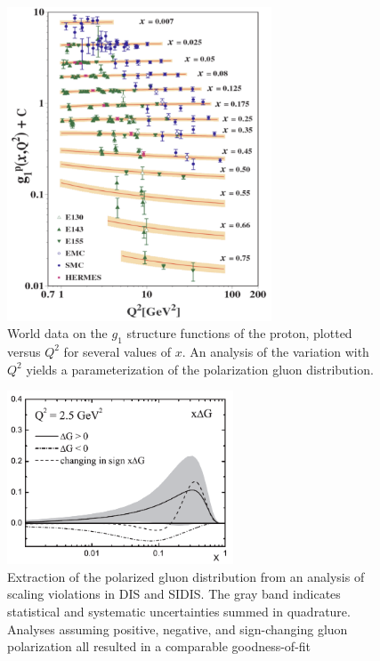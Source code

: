 \begin{figure}
  \centering
  \includegraphics[width=0.7\textwidth]{figures/g1_x_q2}
  \caption{World data on the $g_1$ structure functions of the proton, plotted
  versus $Q^2$ for several values of $x$. An analysis of the variation with
  $Q^2$ yields a parameterization of the polarization gluon distribution.}
  \label{fig:g1-versus-q2}
\end{figure}

\begin{figure}
  \centering
  \includegraphics[width=0.6\textwidth]{figures/lss06_deltag}
  \caption{Extraction of the polarized gluon distribution from an analysis of
  scaling violations in DIS and SIDIS. The gray band indicates statistical and
  systematic uncertainties summed in quadrature. Analyses assuming positive,
  negative, and sign-changing gluon polarization all resulted in a comparable
  goodness-of-fit \cite{Leader:2006xc}}
  \label{fig:g1-deltag}
\end{figure}
